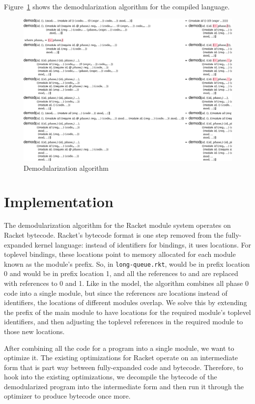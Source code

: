 \documentclass[ms,electronic,letterpaper,lol,lof,lot]{byumsphd}
\begin{document}
Figure~\ref{demod-redex} shows the demodularization algorithm for the compiled language.
\begin{figure}[h]
\includegraphics[width=\textwidth]{demod-redex}
\caption{Demodularization algorithm}
\label{demod-redex}
\end{figure}

\chapter{Implementation}

The demodularization algorithm for the Racket module system operates on Racket bytecode. 
Racket's bytecode format is one step removed from the fully-expanded kernel language: instead of identifiers for bindings, it uses locations.
For toplevel bindings, these locations point to memory allocated for each module known as the module's prefix.
So, in \texttt{long-queue.rkt},  would be in prefix location 0 and  would be in prefix location 1, and all the references to  and  are replaced with references to 0 and 1.
Like in the model, the algorithm combines all phase 0 code into a single module, but since the references are locations instead of identifiers, the locations of different modules overlap.
We solve this by extending the prefix of the main module to have locations for the required module's toplevel identifiers, and then adjusting the toplevel references in the required module to those new locations. 

After combining all the code for a program into a single module, we want to optimize it.
The existing optimizations for Racket operate on an intermediate form that is part way between fully-expanded code and bytecode. 
Therefore, to hook into the existing optimizations, we decompile the bytecode of the demodularized program into the intermediate form and then run it through the optimizer to produce bytecode once more.
\end{document}
